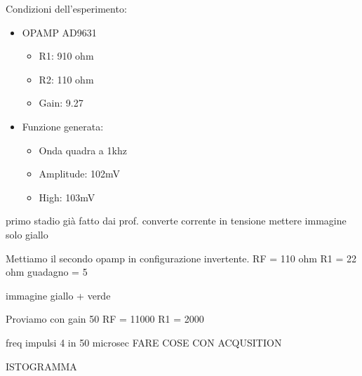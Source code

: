 Condizioni dell'esperimento:
\begin{itemize}
    \item OPAMP AD9631
    \begin{itemize}
        \item R1: 910 ohm
        \item R2: 110 ohm
        \item Gain: 9.27
    \end{itemize}
    
    \item Funzione generata:
    \begin{itemize}
        \item Onda quadra a 1khz
        \item Amplitude: 102mV
        \item High: 103mV
    \end{itemize}
    
\end{itemize}



primo stadio già fatto dai prof. converte corrente in tensione
mettere immagine solo giallo

Mettiamo il secondo opamp in configurazione invertente.
RF = 110 ohm
R1 = 22 ohm 
guadagno = 5

immagine giallo + verde

Proviamo con gain 50 
RF = 11000
R1 = 2000


freq impulsi
4 in 50 microsec
FARE COSE CON ACQUSITION

ISTOGRAMMA

